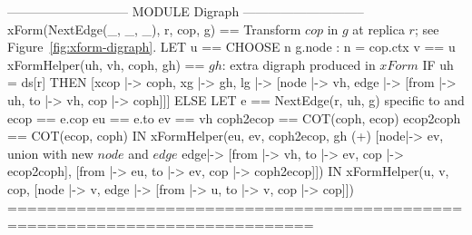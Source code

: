 \documentclass{article}
\begin{document}
\begin{tla}
----------------------------- MODULE Digraph -----------------------------
xForm(NextEdge(_, _, _), r, cop, g) == \* Transform $cop$ in $g$ at replica $r$; see Figure~\ref{fig:xform-digraph}.
    LET u == CHOOSE n \in g.node : n = cop.ctx    v == u 
        xFormHelper(uh, vh, coph, gh) == \* $gh$: extra digraph produced in $xForm$
            IF uh = ds[r] THEN [xcop |-> coph, xg |-> gh,
                 lg |-> [node |-> {vh}, edge |-> {[from |-> uh, to |-> vh, cop |-> coph]}]] 
            ELSE LET e == NextEdge(r, uh, g) \* specific to \cjupiter{} and \xjupiter{}
                  ecop == e.cop    eu == e.to    ev == vh 
             coph2ecop == COT(coph, ecop)    ecop2coph == COT(ecop, coph)
                 IN  xFormHelper(eu, ev, coph2ecop,
                       gh (+) [node|-> {ev}, \* union with new $node$ and $edge$
                               edge|-> {[from |-> vh, to |-> ev, cop |-> ecop2coph],
                                        [from |-> eu, to |-> ev, cop |-> coph2ecop]}])
    IN xFormHelper(u, v, cop, [node |-> {v}, edge |-> {[from |-> u, to |-> v, cop |-> cop]}])  
=============================================================================
\end{tla}
\end{document}
